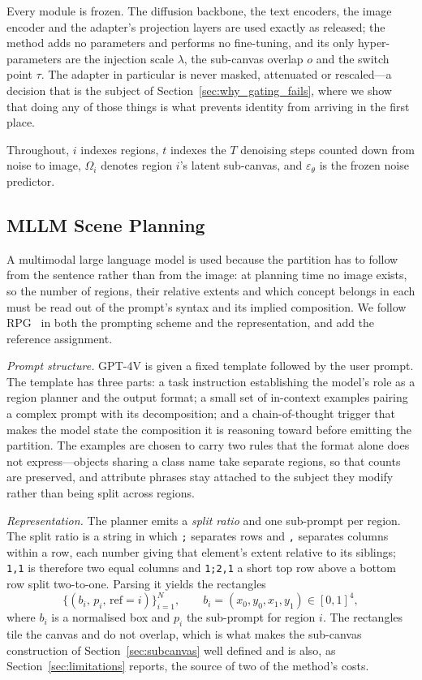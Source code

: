 \documentclass[review,10pt,times]{elsarticle}
\begin{document}
Every module is frozen.  The diffusion backbone, the text encoders, the image
encoder and the adapter's projection layers are used exactly as released; the
method adds no parameters and performs no fine-tuning, and its only
hyper-parameters are the injection scale $\lambda$, the sub-canvas overlap
$o$ and the switch point $\tau$.  The adapter in particular is never masked,
attenuated or rescaled---a decision that is the subject of
Section~\ref{sec:why_gating_fails}, where we show that doing any of those
things is what prevents identity from arriving in the first place.

Throughout, $i$ indexes regions, $t$ indexes the $T$ denoising steps counted
down from noise to image, $\Omega_i$ denotes region $i$'s latent sub-canvas,
and $\varepsilon_\theta$ is the frozen noise predictor.

\subsection{MLLM Scene Planning}
\label{sec:planning}

A multimodal large language model is used because the partition has to follow
from the sentence rather than from the image: at planning time no image
exists, so the number of regions, their relative extents and which concept
belongs in each must be read out of the prompt's syntax and its implied
composition.  We follow RPG~\cite{yang2024mastering} in both the prompting
scheme and the representation, and add the reference assignment.

\noindent\textit{Prompt structure.}
GPT-4V is given a fixed template followed by the user prompt.  The template
has three parts: a task instruction establishing the model's role as a region
planner and the output format; a small set of in-context examples pairing a
complex prompt with its decomposition; and a chain-of-thought trigger that
makes the model state the composition it is reasoning toward before emitting
the partition.  The examples are chosen to carry two rules that the format
alone does not express---objects sharing a class name take separate regions,
so that counts are preserved, and attribute phrases stay attached to the
subject they modify rather than being split across regions.

\noindent\textit{Representation.}
The planner emits a \emph{split ratio} and one sub-prompt per region.  The
split ratio is a string in which \texttt{;} separates rows and \texttt{,}
separates columns within a row, each number giving that element's extent
relative to its siblings; \texttt{1,1} is therefore two equal columns and
\texttt{1;2,1} a short top row above a bottom row split two-to-one.  Parsing
it yields the rectangles
\begin{equation}
  \bigl\{(b_i,\, p_i,\, \mathrm{ref}{=}i)\bigr\}_{i=1}^{N},
  \qquad b_i=(x_0,y_0,x_1,y_1)\in[0,1]^4 ,
\end{equation}
where $b_i$ is a normalised box and $p_i$ the sub-prompt for region $i$.  The
rectangles tile the canvas and do not overlap, which is what makes the
sub-canvas construction of Section~\ref{sec:subcanvas} well defined and is
also, as Section~\ref{sec:limitations} reports, the source of two of the
method's costs.
\end{document}

